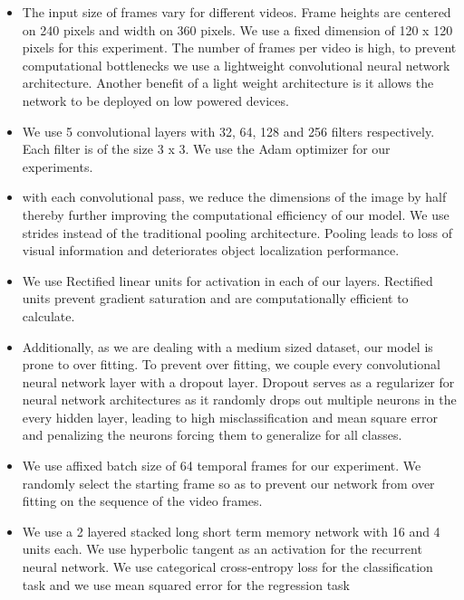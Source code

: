 \documentclass[sigconf]{acmart}
\begin{document}
\begin{itemize}
\setlength\itemsep{1em}

\item The input size of frames vary for different videos. Frame heights are centered on 240 pixels and width on 360 pixels. We use a fixed dimension of 120 x 120 pixels for this experiment. The number of frames per video is high, to prevent computational bottlenecks we use a lightweight convolutional neural network architecture. Another benefit of a light weight architecture is it allows the network to be deployed on low powered devices. 

\item We use 5 convolutional layers with 32, 64, 128 and 256 filters respectively. Each filter is of the size 3 x 3. We use the Adam optimizer for our experiments.

\item with each convolutional pass, we reduce the dimensions of the image by half thereby further improving the computational efficiency of our model. We use strides instead of the traditional pooling architecture. Pooling leads to loss of visual information and deteriorates object localization performance. 

\item We use Rectified linear units for activation in each of our layers. Rectified units prevent gradient saturation and are computationally efficient to calculate.

\item  Additionally, as we are dealing with a medium sized dataset, our model is prone to over fitting. To prevent over fitting, we couple every convolutional neural network layer with a dropout layer. Dropout serves as a regularizer for neural network architectures as it randomly drops out multiple neurons in the every hidden layer, leading to high misclassification and mean square error and penalizing the neurons forcing them to generalize for all classes.

\item We use affixed batch size of 64 temporal frames for our experiment. We randomly select the starting frame so as to prevent our network from over fitting on the sequence of the video frames.

\item We use a 2 layered stacked long short term memory network with 16 and 4 units each. We use hyperbolic tangent as an activation for the recurrent neural network. We use categorical cross-entropy loss for the classification task and we use mean squared error for the regression task 


\end{itemize}
\end{document}
